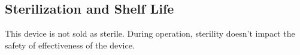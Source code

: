 \newpage
\subsection{Sterilization and Shelf Life}

This device is not sold as sterile. During operation, sterility
doesn't impact the safety of effectiveness of the device.
